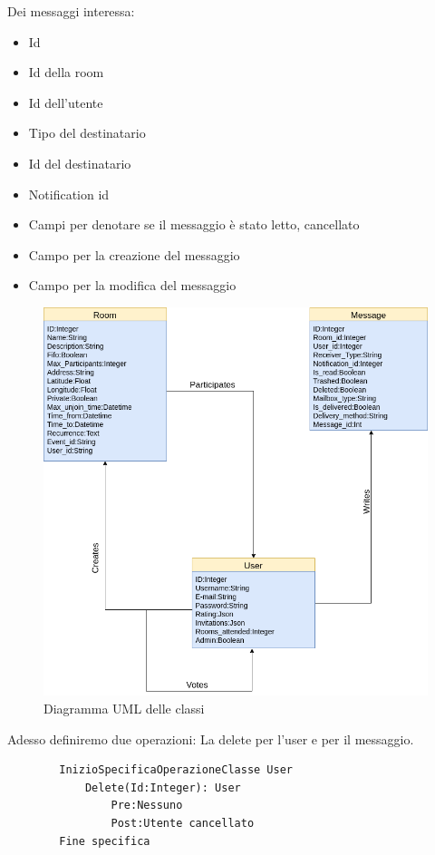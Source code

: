 	Dei messaggi interessa:
	\begin{itemize}
		\item Id
		\item Id della room
		\item Id dell'utente
		\item Tipo del destinatario
		\item Id del destinatario
		\item Notification id
		\item Campi per denotare se il messaggio è stato letto, cancellato
		\item Campo per la creazione del messaggio
		\item Campo per la modifica del messaggio
	\end{itemize}
	\begin{figure}[H]
		\centering
		\includegraphics[width=\textwidth]{./media/UML.png}
		\caption{Diagramma UML delle classi}
	\end{figure}
	
	Adesso definiremo due operazioni: La delete per l'user e per il messaggio.
	
	\begin{lstlisting}
		InizioSpecificaOperazioneClasse User
			Delete(Id:Integer): User
				Pre:Nessuno
				Post:Utente cancellato
		Fine specifica
	\end{lstlisting}

